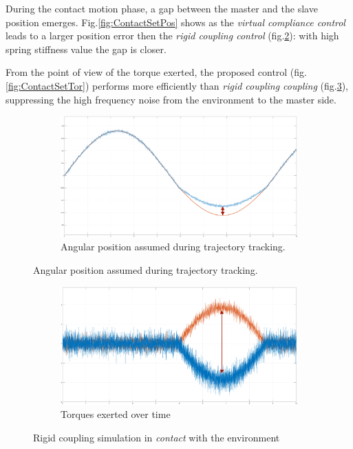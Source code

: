 
During the contact motion phase, a gap between the master and the slave position emerges. Fig.\ref{fig:ContactSetPos} shows as the \textit{virtual compliance control} leads to a larger position error then the \textit{rigid coupling control }(fig.\ref{fig:ContactRigPos}): with high spring stiffness value the gap is closer.

From the point of view of the torque exerted, the proposed control
(fig.\ref{fig:ContactSetTor}) performs more efficiently than \textsl{rigid coupling coupling} (fig.\ref{fig:ContactRigTor}), suppressing the high frequency noise from the environment to the master side.

  
\begin{figure}[h]
	\begin{subfigure}{1\linewidth}
		\centering
		\includegraphics[width=\textwidth, height=0.41\textwidth]{Images/rigidContactReacPosArrow}
		\caption{ Angular position assumed during trajectory tracking.}
		\label{fig:ContactRigPos}
	\end{subfigure}	
\end{figure}
\begin{figure}[h]\ContinuedFloat
	\begin{subfigure}{1\linewidth}
		\centering
		\includegraphics[width=\textwidth, height=0.41\textwidth]{Images/rigidContactReacTorArrow}
		\caption{ Torques exerted over time}
		\label{fig:ContactRigTor}
	\end{subfigure}	
  \caption{ Rigid coupling simulation in \textsl{contact} with the environment}
  \label{fig:contact_rigid}
\end{figure}


